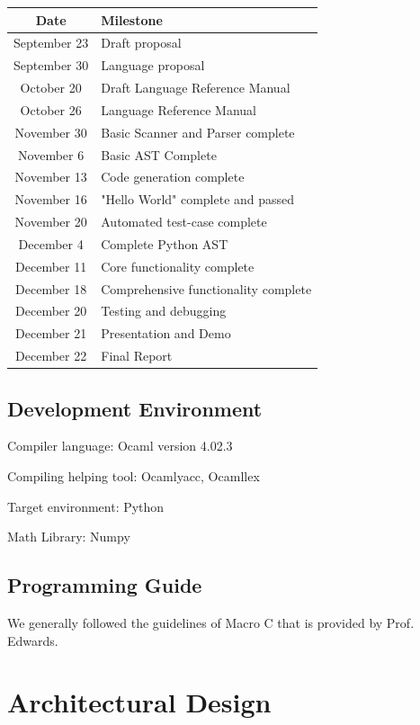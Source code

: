 \documentclass[12pt]{article} %
\begin{document}
\begin{tabular}{| c | l |}
	\hline
	Date & Milestone \\
	\hline
	September 23 & Draft proposal \\
	September 30 & Language proposal \\
	October 20 & Draft Language Reference Manual \\
	October 26 & Language Reference Manual \\
	November 30 & Basic Scanner and Parser complete \\
	November 6 & Basic AST Complete\\
	November 13 & Code generation complete \\
	November 16 & "Hello World" complete and passed \\
	November 20 & Automated test-case complete \\
	December 4 & Complete Python AST \\
	December 11 & Core functionality complete \\
	December 18 & Comprehensive functionality complete \\
	December 20 & Testing and debugging \\ 
	December 21 & Presentation and Demo \\ 
	December 22 & Final Report \\
	\hline
\end{tabular}


\subsection{Development Environment}
\noindent Compiler language: Ocaml version 4.02.3

\noindent Compiling helping tool: Ocamlyacc, Ocamllex 

\noindent Target environment: Python

\noindent Math Library: Numpy

\subsection{Programming Guide}
We generally followed the guidelines of Macro C that is provided by Prof. Edwards.

\section{Architectural Design}
\end{document}
